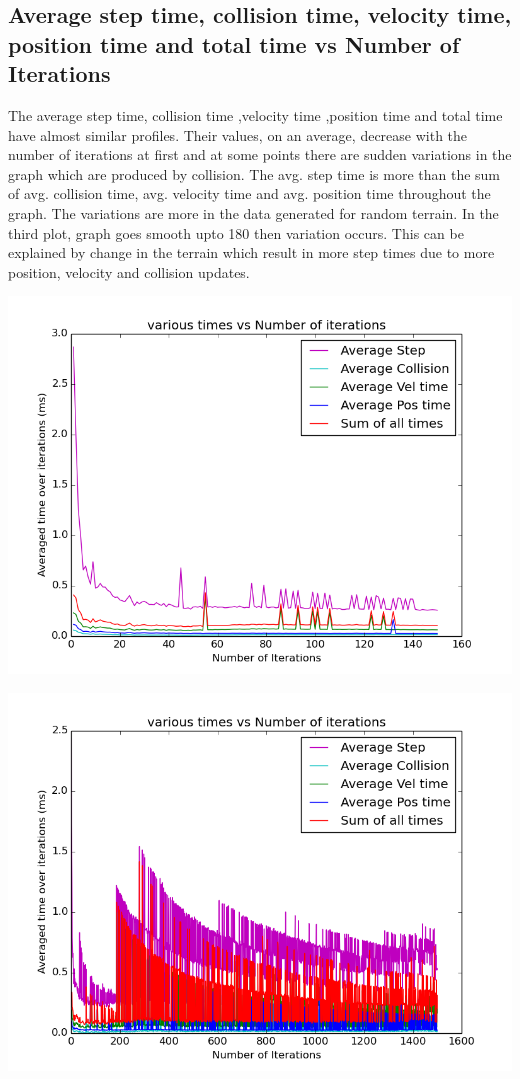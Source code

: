 \documentclass[11pt]{article}
\begin{document}
	\subsection{Average step time, collision time, velocity time, position time and total time vs Number of Iterations} 
	The average step time, collision time ,velocity time ,position time and total time have almost similar profiles. Their values, on an average, decrease with 
	the number of iterations at first and at some points there are sudden variations in the graph which are produced by collision. The avg. step time  
	is more than the sum of avg. collision time, avg. velocity time and avg. position time throughout the graph. The variations are more in the data generated
	for random terrain. In the third plot, graph goes smooth upto 180 then variation occurs. This can be explained by change in the terrain which result in more 
	step times due to more position, velocity and collision updates.
	\begin{center}
	  \includegraphics[scale=0.5]{images/g26_plot01_150x10_even}
	\end{center}	
	\begin{center}
	  \includegraphics[scale=0.5]{images/g26_plot01_1500x10_random}
	\end{center}
\end{document}
